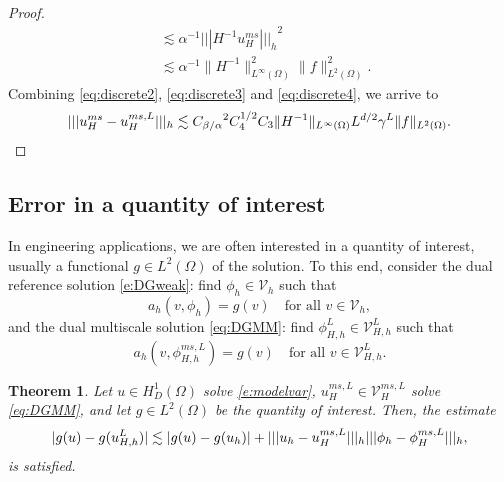 \documentclass[10pt]{article}
\numberwithin{equation}{section}
\theoremstyle{plain}
\newtheorem{theorem}{Theorem}
\theoremstyle{definition}
\theoremstyle{remark}
\begin{document}
\begin{proof}
\begin{equation}
\begin{aligned}
      & \lesssim {\alpha}^{-1}{||| {H^{-1}{u^{ms}_{H}}} |||_h}^2 \\
      &\lesssim \alpha^{-1}\|H^{-1}\|^2_{L^\infty(\Omega)}\|f\|_{L^2(\Omega)}^2.
    \end{aligned}
  \end{equation}
  Combining \eqref{eq:discrete2}, \eqref{eq:discrete3} and \eqref{eq:discrete4}, we arrive to
  \begin{equation}\notag
    {||| {{u^{ms}_{H}}-{u^{ms,L}_{H}}} |||_h} \lesssim {C_{{\beta}/{\alpha}}}^2C_4^{1/2}C_3\|H^{-1}\|_{L^\infty(\Omega)}L^{d/2}\gamma^L\|f\|_{L^2(\Omega)}.
  \end{equation}
\end{proof}
\subsection{Error in a quantity of interest}\label{ss:quantity}
In engineering applications, we are often interested in a quantity of interest, usually a functional $g\in L^2(\Omega)$ of the solution. To this end, consider the dual reference solution \eqref{e:DGweak}: find $\phi_h\in{\mathcal{V}_h}$ such that
\begin{equation}\label{eq:dual_DGweak}
  a_h(v,\phi_h) = g(v)\quad\text{for all }v\in{\mathcal{V}}_h,
\end{equation}
and the dual multiscale solution \eqref{eq:DGMM}: find $\phi_{H,h}^L\in{\mathcal{V}}_{H,h}^L$ such that
\begin{equation}\label{eq:dual_DGMM}
  a_h(v,\phi_{H,h}^{ms,L}) = g(v)\quad\text{for all }v\in{\mathcal{V}}_{H,h}^L.
\end{equation}
\begin{theorem}\label{thm:qoi}
  Let $u\in H^1_D(\Omega)$ solve \eqref{e:modelvar}, $u_H^{ms,L}\in {\mathcal{V}}_H^{ms,L}$ solve \eqref{eq:DGMM}, and let $g\in L^2(\Omega)$ be the quantity of interest. Then, the estimate
  \begin{equation}\notag
    |g(u)-g(u_{H,h}^L)|\lesssim |g(u)-g(u_h)| + {||| {u_h - u_H^{ms,L}} |||_h}{||| {\phi_h - \phi_H^{ms,L}} |||_h},
  \end{equation}
  is satisfied.
\end{theorem}
\end{document}
